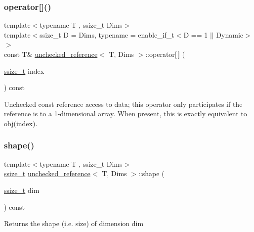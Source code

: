\subsubsection{\texorpdfstring{operator[]()}{operator[]()}}
{\footnotesize\ttfamily template$<$typename T , ssize\+\_\+t Dims$>$ \\
template$<$ssize\+\_\+t D = Dims, typename  = enable\+\_\+if\+\_\+t$<$\+D == 1 $\vert$$\vert$ Dynamic$>$$>$ \\
const T\& \mbox{\hyperlink{classunchecked__reference}{unchecked\+\_\+reference}}$<$ T, Dims $>$\+::operator\mbox{[}$\,$\mbox{]} (\begin{DoxyParamCaption}\item[{\mbox{\hyperlink{detail_2common_8h_ac430d16fc097b3bf0a7469cfd09decda}{ssize\+\_\+t}}}]{index }\end{DoxyParamCaption}) const\hspace{0.3cm}{\ttfamily [inline]}}

Unchecked const reference access to data; this operator only participates if the reference is to a 1-\/dimensional array. When present, this is exactly equivalent to {\ttfamily obj(index)}. \mbox{\label{classunchecked__reference_a5065c039307f9797f8d4dc8f9e422d82}} 
\subsubsection{\texorpdfstring{shape()}{shape()}}
{\footnotesize\ttfamily template$<$typename T , ssize\+\_\+t Dims$>$ \\
\mbox{\hyperlink{detail_2common_8h_ac430d16fc097b3bf0a7469cfd09decda}{ssize\+\_\+t}} \mbox{\hyperlink{classunchecked__reference}{unchecked\+\_\+reference}}$<$ T, Dims $>$\+::shape (\begin{DoxyParamCaption}\item[{\mbox{\hyperlink{detail_2common_8h_ac430d16fc097b3bf0a7469cfd09decda}{ssize\+\_\+t}}}]{dim }\end{DoxyParamCaption}) const\hspace{0.3cm}{\ttfamily [inline]}}



Returns the shape (i.\+e. size) of dimension {\ttfamily dim} 

\mbox{\label{classunchecked__reference_af1713056b2abec0c2b0fa62e78464537}} 
